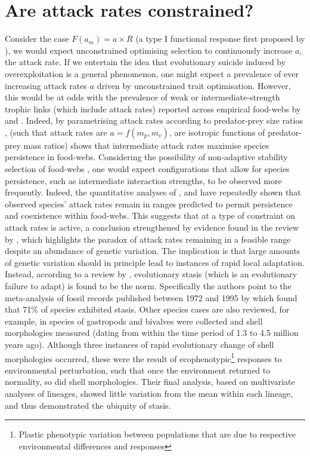 \documentclass[a4paper]{report}
\begin{document}
\section{Are attack rates constrained? \label{sec:weak}}

Consider the case $F(a_m)=a \times R$ (a type I functional response first proposed by \citep{Holling1959}), we would expect unconstrained optimising selection to continuously increase $a$, the attack rate. If we entertain the idea that evolutionary suicide induced by overexploitation is a general phenomenon, one might expect a prevalence of ever increasing attack rates $a$ driven by unconstrained trait optimisation. However, this would be at odds with the prevalence of weak or intermediate-strength trophic links (which include attack rates) reported across empirical food-webs by \citep{Paine1992} and \citep{Berlow1999}. Indeed, by parametrising attack rates according to predator-prey size ratios \citep{guzman2019}, (such that attack rates are $a = f(m_p,m_v)$, are isotropic functions of predator-prey mass ratios) shows that intermediate attack rates maximise species persistence in food-webs. Considering the possibility of non-adaptive stability selection of food-webs \citep{Borrelli2015}, one would expect configurations that allow for species persistence, such as intermediate interaction strengths, to be observed more frequently. Indeed, the quantitative analyses of \citep{guzman2019}, \citep{Brose2006a} and \citep{Pawar2019} have repeatedly shown that observed species’ attack rates remain in ranges predicted to permit persistence and coexistence within food-webs. This suggests that at a type of constraint on attack rates is active, a conclusion strengthened by evidence found in the review by \citep{Futuyma2010}, which highlights the paradox of attack rates remaining in a feasible range despite an abundance of genetic variation. The implication is that large amounts of genetic variation should in principle lead to instances of rapid local adaptation. Instead, according to a review by \citep{Pearson2001}, evolutionary stasis (which is an evolutionary failure to adapt) is found to be the norm. Specifically the authors point to the meta-analysis of fossil records published between 1972 and 1995 by \citep{Pearson2001} which found that 71$\%$ of species exhibited stasis. Other species cases are also reviewed, for example, in \citep{Choen83} species of gastropods and bivalves were collected and shell morphologies measured (dating from within the time period of 1.3 to 4.5 million years ago). Although three instances of rapid evolutionary change of shell morphologies occurred, these were the result of ecophenotypic\footnote{Plastic phenotypic variation between populations that are due to respective environmental differences and responses} responses to environmental perturbation, such that once the environment returned to normality, so did shell morphologies. Their final analysis, based on multivariate analyses of lineages, showed little variation from the mean within each lineage, and thus demonstrated the ubiquity of stasis.\\
\end{document}
